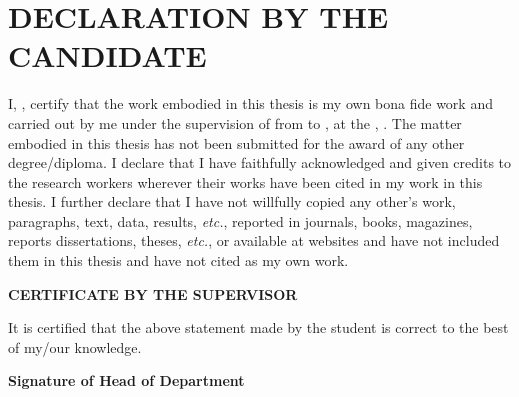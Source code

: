 \chapter*{\centering\normalsize DECLARATION BY THE CANDIDATE}
I, \textbf{\theauthor{}}, certify that the work embodied in this thesis is my own bona fide work and carried out by me under the supervision of \textbf{\supervisor{}} from \textbf{\projectstart{}} to \textbf{\projectend{}}, at the \textbf{\department{}}, \institute{}. The matter embodied in this thesis has not been submitted for the award of any other degree/diploma. I declare that I have faithfully acknowledged and given credits to the research workers wherever their works have been cited in my work in this thesis. I further declare that I have not willfully copied any other's work, paragraphs, text, data, results, \textit{etc.}, reported in journals, books, magazines, reports dissertations, theses, \textit{etc.}, or available at websites and have not included them in this thesis and have not cited as my own work.



\vspace{-0.5cm}

\textbf{\centering CERTIFICATE BY THE SUPERVISOR\\}

\vspace{1cm}

It is certified that the above statement made by the student is correct to the best of my/our
knowledge.



\vfill

{\centering\textbf{Signature of Head of Department
\\}}
